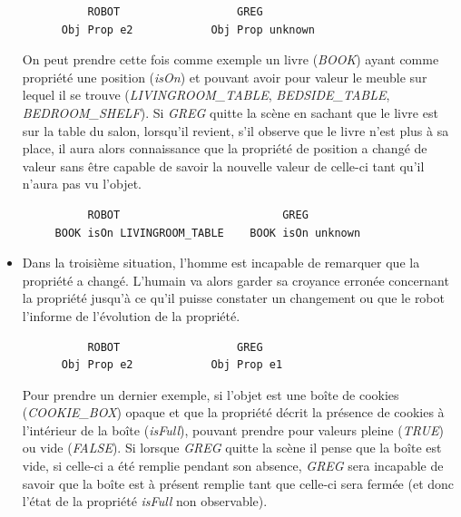 \documentclass[a4paper,11pt,twoside]{StyleThese}
\begin{document}
\begin{itemize}
\begin{scriptsize}
\begin{verbatim}
          ROBOT                  GREG
      Obj Prop e2            Obj Prop unknown
\end{verbatim}
\end{scriptsize}



On peut prendre cette fois comme exemple un livre (\textit{BOOK}) ayant comme propriété une position (\textit{isOn}) et pouvant avoir pour valeur le meuble sur lequel il se trouve (\textit{LIVINGROOM\_TABLE}, \textit{BEDSIDE\_TABLE}, \textit{BEDROOM\_SHELF}). Si \textit{GREG} quitte la scène en sachant que le livre est sur la table du salon, lorsqu'il revient, s'il observe que le livre n'est plus à sa place, il aura alors connaissance que la propriété de position a changé de valeur sans être capable de savoir la nouvelle valeur de celle-ci tant qu'il n'aura pas vu l'objet.

\begin{scriptsize}
\begin{verbatim}
          ROBOT                         GREG
     BOOK isOn LIVINGROOM_TABLE    BOOK isOn unknown
\end{verbatim}
\end{scriptsize}



\item Dans la troisième situation, l'homme est incapable de remarquer que la propriété a changé. L'humain va alors garder sa croyance erronée concernant la propriété jusqu'à ce qu'il puisse constater un changement ou que le robot l'informe de l'évolution de la propriété. 

\begin{scriptsize}
\begin{verbatim}
          ROBOT                  GREG
      Obj Prop e2            Obj Prop e1
\end{verbatim}
\end{scriptsize}

Pour prendre un dernier exemple, si l'objet est une boîte de cookies (\textit{COOKIE\_BOX}) opaque et que la propriété décrit la présence de cookies à l'intérieur de la boîte (\textit{isFull}), pouvant prendre pour valeurs pleine (\textit{TRUE}) ou vide (\textit{FALSE}). Si lorsque \textit{GREG} quitte la scène il pense que la boîte est vide, si celle-ci a été remplie pendant son absence, \textit{GREG} sera incapable de savoir que la boîte est à présent remplie tant que celle-ci sera fermée (et donc l'état de la propriété \textit{isFull} non observable).


\end{itemize}
\end{document}

